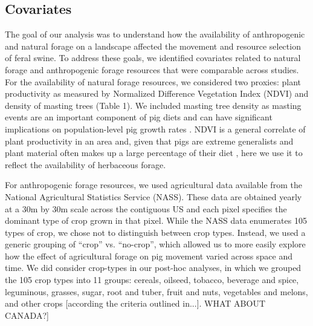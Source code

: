 \documentclass[a4paper]{article}
\begin{document}
\subsection*{Covariates}

The goal of our analysis was to understand how the availability of anthropogenic and natural forage on a landscape affected the movement and resource selection of feral swine. To address these goals, we identified covariates related to natural forage and anthropogenic forage resources that were comparable across studies.  For the availability of natural forage resources, we considered two proxies: plant productivity as measured by Normalized Difference Vegetation Index (NDVI) and density of masting trees (Table 1). We included masting tree density as masting events are an important component of pig diets and can have significant implications on population-level pig growth rates \citep[e.g.][]{Bieber2005}.  NDVI is a general correlate of plant productivity in an area \citep{Pettorelli2005} and, given that pigs are extreme generalists and plant material often makes up a large percentage of their diet \citep{Mayer2009}, here we use it to reflect the availability of herbaceous forage.  


For anthropogenic forage resources, we used agricultural data available from the National Agricultural Statistics Service (NASS). These data are obtained yearly at a 30m by 30m scale across the contiguous US and each pixel specifies the dominant type of crop grown in that pixel.  While the NASS data enumerates 105 types of crop, we chose not to distinguish between crop types. Instead, we used a generic grouping of ``crop'' vs. ``no-crop'', which allowed us to more easily explore how the effect of agricultural forage on pig movement varied across space and time.  We did consider crop-types in our post-hoc analyses, in which we grouped the 105 crop types into 11 groups: cereals, oilseed, tobacco, beverage and spice, leguminous, grasses, sugar, root and tuber, fruit and nuts, vegetables and melons, and other crops [according the criteria outlined in...]. WHAT ABOUT CANADA?]
\end{document}
